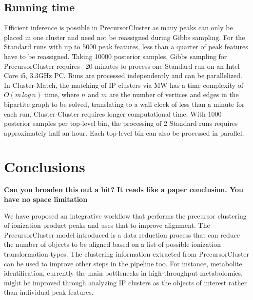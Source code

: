 \subsection{Running time}

Efficient inference is possible in PrecursorCluster as many peaks can only be placed in one cluster and need not be reassigned during Gibbs sampling. For the Standard runs with up to 5000 peak features, less than a quarter of peak features have to be reassigned. Taking 10000 posterior samples, Gibbs sampling for PrecursorCluster requires ~20 minutes to process one Standard run on an Intel Core i5, 3.3GHz PC. Runs are processed independently and can be parallelized. In Cluster-Match, the matching of IP clusters via MW has a time complexity of $O(m\, log\, n)$ time, where $n$ and $m$ are the number of vertices and edges in the bipartite graph to be solved, translating to a wall clock of less than a minute for each run. Cluster-Cluster requires longer computational time. With 1000 posterior samples per top-level bin, the processing of 2 Standard runs requires approximately half an hour. Each top-level bin can also be processed in parallel.

\section{Conclusions}

\textbf{Can you broaden this out a bit? It reads like a paper conclusion. You have no space limitation}

We have proposed an integrative workflow that performs the precursor clustering of ionization product peaks and uses that to improve alignment. The PrecursorCluster model introduced is a data reduction process that can reduce the number of objects to be aligned based on a list of possible ionization transformation types. The clustering information extracted from PrecursorCluster can be used to improve other steps in the pipeline too. For instance, metabolite identification, currently the main bottlenecks in high-throughput metabolomics, might be improved through analyzing IP clusters as the objects of interest rather than individual peak features. 

